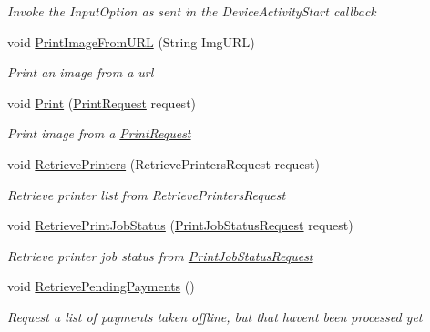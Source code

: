 \begin{DoxyCompactItemize}
\begin{DoxyCompactList}\small\item\em Invoke the Input\+Option as sent in the Device\+Activity\+Start callback \end{DoxyCompactList}\item 
void \hyperlink{interfacecom_1_1clover_1_1remotepay_1_1sdk_1_1_i_clover_connector_a16ffe34012c788351332d1d2c41be602}{Print\+Image\+From\+U\+RL} (String Img\+U\+RL)
\begin{DoxyCompactList}\small\item\em Print an image from a url \end{DoxyCompactList}\item 
void \hyperlink{interfacecom_1_1clover_1_1remotepay_1_1sdk_1_1_i_clover_connector_a7145ff62e892d12f7461236bf67079c3}{Print} (\hyperlink{classcom_1_1clover_1_1remotepay_1_1sdk_1_1_print_request}{Print\+Request} request)
\begin{DoxyCompactList}\small\item\em Print image from a \hyperlink{classcom_1_1clover_1_1remotepay_1_1sdk_1_1_print_request}{Print\+Request} \end{DoxyCompactList}\item 
void \hyperlink{interfacecom_1_1clover_1_1remotepay_1_1sdk_1_1_i_clover_connector_afae3060fb1b64065a2788af99031bbf4}{Retrieve\+Printers} (Retrieve\+Printers\+Request request)
\begin{DoxyCompactList}\small\item\em Retrieve printer list from Retrieve\+Printers\+Request \end{DoxyCompactList}\item 
void \hyperlink{interfacecom_1_1clover_1_1remotepay_1_1sdk_1_1_i_clover_connector_a36a6d360ab810558e7a78e9d09bffc5e}{Retrieve\+Print\+Job\+Status} (\hyperlink{classcom_1_1clover_1_1remotepay_1_1sdk_1_1_print_job_status_request}{Print\+Job\+Status\+Request} request)
\begin{DoxyCompactList}\small\item\em Retrieve printer job status from \hyperlink{classcom_1_1clover_1_1remotepay_1_1sdk_1_1_print_job_status_request}{Print\+Job\+Status\+Request} \end{DoxyCompactList}\item 
void \hyperlink{interfacecom_1_1clover_1_1remotepay_1_1sdk_1_1_i_clover_connector_a5d371f91336d4950e32ff051061ad91d}{Retrieve\+Pending\+Payments} ()
\begin{DoxyCompactList}\small\item\em Request a list of payments taken offline, but that haven\textquotesingle{}t been processed yet \end{DoxyCompactList}\item 

\end{DoxyCompactItemize}
